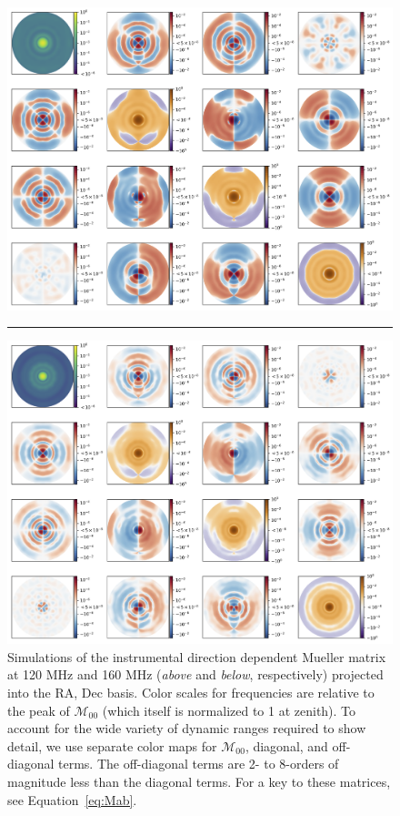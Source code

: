 \documentclass[twocolumn, trackchanges]{aastex61}
\begin{document}
\begin{figure}
\centering
\includegraphics[scale=0.4]{full_mueller_120MHz.png}
\par\noindent\rule{0.8\textwidth}{0.4pt}
\includegraphics[scale=0.4]{full_mueller_160MHz.png}
\caption{Simulations of the instrumental direction dependent Mueller matrix at 120 MHz and 160 MHz (\textit{above} and \textit{below}, respectively) projected into the RA, Dec basis. Color scales for frequencies are relative to the peak of $\mathcal{M}_{00}$ (which itself is normalized to 1 at zenith). To account for the wide variety of dynamic ranges required to show detail, we use separate color maps for $\mathcal{M}_{00}$, diagonal, and off-diagonal terms. The off-diagonal terms are 2- to 8-orders of magnitude less than the diagonal terms. For a key to these matrices, see Equation~\ref{eq:Mab}.
}
\label{fig:mueller}
\end{figure}
\end{document}
